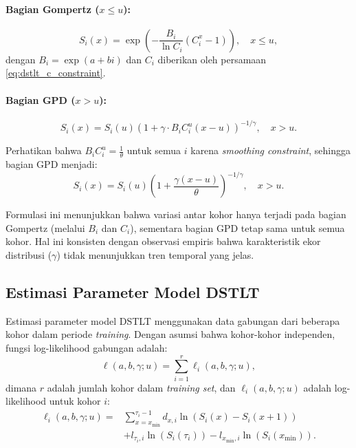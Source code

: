 \paragraph{Bagian Gompertz ($x \leq u$):}
\begin{equation}
S_i(x) = \exp\left(-\frac{B_i}{\ln C_i}(C_i^x - 1)\right), \quad x \leq u,
\label{eq:dstlt_gompertz_survival}
\end{equation}
dengan $B_i = \exp(a + bi)$ dan $C_i$ diberikan oleh persamaan \eqref{eq:dstlt_c_constraint}.

\paragraph{Bagian GPD ($x > u$):}
\begin{equation}
S_i(x) = S_i(u) \left(1 + \gamma \cdot B_i C_i^u(x-u)\right)^{-1/\gamma}, \quad x > u.
\label{eq:dstlt_gpd_survival}
\end{equation}

Perhatikan bahwa $B_i C_i^u = \frac{1}{\theta}$ untuk semua $i$ karena \textit{smoothing constraint}, sehingga bagian GPD menjadi:
\begin{equation}
S_i(x) = S_i(u) \left(1 + \frac{\gamma(x-u)}{\theta}\right)^{-1/\gamma}, \quad x > u.
\label{eq:dstlt_gpd_survival_simplified}
\end{equation}

Formulasi ini menunjukkan bahwa variasi antar kohor hanya terjadi pada bagian Gompertz (melalui $B_i$ dan $C_i$), sementara bagian GPD tetap sama untuk semua kohor. Hal ini konsisten dengan observasi empiris bahwa karakteristik ekor distribusi ($\gamma$) tidak menunjukkan tren temporal yang jelas.

\subsection{Estimasi Parameter Model DSTLT}

Estimasi parameter model DSTLT menggunakan data gabungan dari beberapa kohor dalam periode \textit{training}. Dengan asumsi bahwa kohor-kohor independen, fungsi log-likelihood gabungan adalah:
\begin{equation}
\ell(a, b, \gamma; u) = \sum_{i=1}^{r} \ell_i(a, b, \gamma; u),
\label{eq:dstlt_joint_loglikelihood}
\end{equation}
dimana $r$ adalah jumlah kohor dalam \textit{training set}, dan $\ell_i(a, b, \gamma; u)$ adalah log-likelihood untuk kohor $i$:
\begin{equation}
\begin{split}
\ell_i(a, b, \gamma; u) = &\sum_{x=x_{\text{min}}}^{\tau_i-1} d_{x,i} \ln(S_i(x) - S_i(x+1)) \\
&+ l_{\tau_i,i} \ln(S_i(\tau_i)) - l_{x_{\text{min}},i} \ln(S_i(x_{\text{min}})).
\end{split}
\label{eq:dstlt_single_loglikelihood}
\end{equation}


